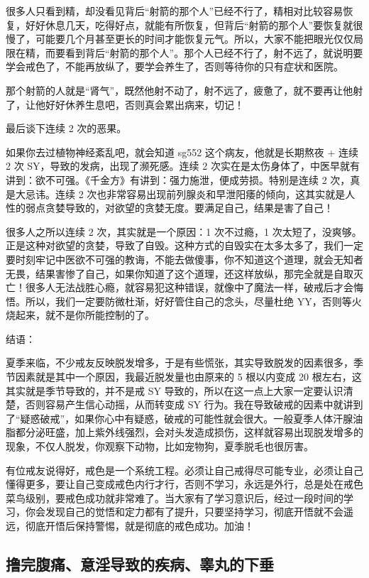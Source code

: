 \documentclass[fontset=founder]{ctexart}
\begin{document}
很多人只看到精，却没看见背后“射箭的那个人”已经不行了，精相对比较容易恢复，好好休息几天，吃得好点，就能有所恢复，但背后“射箭的那个人”要恢复就很慢了，可能要几个月甚至更长的时间才能恢复元气。所以，大家不能把眼光仅仅局限在精，而要看到背后“射箭的那个人”。那个人已经不行了，射不远了，就说明要学会戒色了，不能再放纵了，要学会养生了，否则等待你的只有症状和医院。

那个射箭的人就是“肾气”，既然他射不动了，射不远了，疲惫了，就不要再让他射了，让他好好休养生息吧，否则真会累出病来，切记！

最后谈下连续 2 次的恶果。

如果你去过植物神经紊乱吧，就会知道 sg552 这个病友，他就是长期熬夜 + 连续 2 次 SY，导致的发病，出现了濒死感。连续 2 次实在是太伤身体了，中医早就有讲到：欲不可强。《千金方》有讲到：强力施泄，便成劳损。特别是连续 2 次，真是大忌讳。连续 2 次也非常容易出现前列腺炎和早泄阳痿的倾向，这其实就是人性的弱点贪婪导致的，对欲望的贪婪无度。要满足自己，结果是害了自己！

很多人之所以连续 2 次，其实就是一个原因：1 次不过瘾，1 次太短了，没爽够。正是这种对欲望的贪婪，导致了自毁。这种方式的自毁实在太多太多了，我们一定要时刻牢记中医欲不可强的教诲，不能去做傻事，你不知道这个道理，就会无知者无畏，结果害惨了自己，如果你知道了这个道理，还这样放纵，那完全就是自取灭亡！很多人无法战胜心瘾，就容易犯这种错误，就像中了魔法一样，破戒后才会悔悟。所以，我们一定要防微杜渐，好好管住自己的念头，尽量杜绝 YY，否则等火烧起来，就不是你所能控制的了。

结语：

夏季来临，不少戒友反映脱发增多，于是有些慌张，其实导致脱发的因素很多，季节因素就是其中一个原因，我最近脱发量也由原来的 5 根以内变成 20 根左右，这其实就是季节导致的，并不是戒 SY 导致的，所以在这一点上大家一定要认识清楚，否则容易产生信心动摇，从而转变成 SY 行为。我在导致破戒的因素中就讲到了“疑惑破戒”，如果你心中有疑惑，破戒的可能性就会很大。一般夏季人体汗腺油脂都分泌旺盛，加上紫外线强烈，会对头发造成损伤，这样就容易出现脱发增多的现象，不仅人脱发，你观察下动物，比如宠物狗，夏季脱毛也很厉害。

有位戒友说得好，戒色是一个系统工程。必须让自己戒得尽可能专业，必须让自己懂得更多，要让自己变成戒色内行才行，否则不学习，永远是外行，总是处在戒色菜鸟级别，要戒色成功就非常难了。当大家有了学习意识后，经过一段时间的学习，你会发现自己的觉悟和定力都有了提升，只要坚持学习，彻底开悟就不会遥远，彻底开悟后保持警惕，就是彻底的戒色成功。加油！

\subsection{撸完腹痛、意淫导致的疾病、睾丸的下垂}
\end{document}
